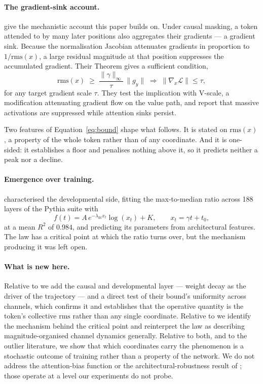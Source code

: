 \documentclass[11pt]{article}
\newcommand{\rms}{\mathrm{rms}}
\begin{document}
\paragraph{The gradient-sink account.} \citet{chen2026gradient} give the mechanistic
account this paper builds on. Under causal masking, a token attended to by many
later positions also aggregates their gradients --- a gradient sink. Because the
normalisation Jacobian attenuates gradients in proportion to $1/\rms(x)$, a large
residual magnitude at that position suppresses the accumulated gradient. Their
Theorem gives a sufficient condition,
\begin{equation}\label{eq:bound}
\rms(x) \;\ge\; \frac{\lVert\gamma\rVert_\infty}{\tau}\,\lVert g_y\rVert
\;\Longrightarrow\;
\lVert\nabla_x\mathcal{L}\rVert \le \tau ,
\end{equation}
for any target gradient scale $\tau$. They test the implication with V-scale, a
modification attenuating gradient flow on the value path, and report that massive
activations are suppressed while attention sinks persist.

Two features of Equation~\eqref{eq:bound} shape what follows. It is stated on
$\rms(x)$, a property of the whole token rather than of any coordinate. And it is
one-sided: it establishes a floor and penalises nothing above it, so it predicts
neither a peak nor a decline.

\paragraph{Emergence over training.} \citet{gallego2025hidden} characterised the
developmental side, fitting the max-to-median ratio across 188 layers of the Pythia
suite with
\begin{equation}\label{eq:lognorm}
f(t) = A\,e^{-\lambda_{\mathrm{fit}} x_t}\log(x_t) + K,
\qquad x_t = \gamma t + t_0 ,
\end{equation}
at a mean $R^2$ of $0.984$, and predicting its parameters from architectural
features. The law has a critical point at which the ratio turns over, but the
mechanism producing it was left open.

\paragraph{What is new here.} Relative to \citet{chen2026gradient} we add the causal
and developmental layer --- weight decay as the driver of the trajectory --- and a
direct test of their bound's uniformity across channels, which confirms it and
establishes that the operative quantity is the token's collective $\rms$ rather than
any single coordinate. Relative to \citet{gallego2025hidden} we identify the
mechanism behind the critical point and reinterpret the law as describing
magnitude-organised channel dynamics generally. Relative to both, and to the outlier
literature, we show that which coordinates carry the phenomenon is a stochastic
outcome of training rather than a property of the network. We do not address the
attention-bias function or the architectural-robustness result of \citet{vemula};
those operate at a level our experiments do not probe.
\end{document}
